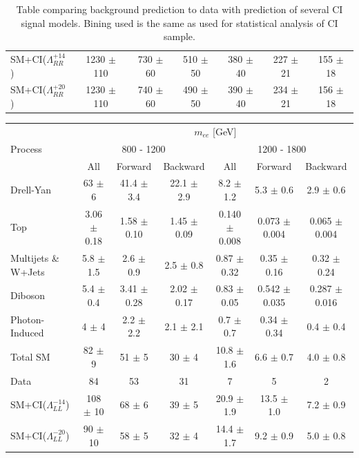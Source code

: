 \begin {table}[h]
\begin{center}
\begin{tabular}{  l | c c c | c c c  }
			SM+CI($\Lambda^{+14}_{RR}$) & 1230 $\pm$ 110 & 730 $\pm$ 60 & 510 $\pm$ 50 & 380 $\pm$ 40 & 227 $\pm$ 21 & 155 $\pm$ 18 \\
			SM+CI($\Lambda^{+20}_{RR}$) & 1230 $\pm$ 110 & 740 $\pm$ 60 & 490 $\pm$ 50 & 390 $\pm$ 40 & 234 $\pm$ 21 & 156 $\pm$ 18 \\
			\hline
		\end{tabular}
	  	\caption{Table comparing background prediction to data with prediction of several CI signal models. Bining used is the same as used for statistical analysis of CI sample.}
	  	\label{tab:CI_results1}
	  	\end{center}
	\end {table}

	\begin {table}[h]
		\footnotesize 
		\begin{center}
		\begin{tabular}{  l | c c c | c c c  }	
			\hline
			\hline
			\multirow{3}{*}{Process} 	& \multicolumn{6}{c}{$m_{ee}$ [GeV]} \\
										& \multicolumn{3}{c}{800 - 1200} & \multicolumn{3}{c}{1200 - 1800} \\
										\cline{2-7}
										& All & Forward & Backward & All & Forward & Backward \\
			\hline
			Drell-Yan & 63 $\pm$ 6 & 41.4 $\pm$ 3.4 & 22.1 $\pm$ 2.9 & 8.2 $\pm$ 1.2 & 5.3 $\pm$ 0.6 & 2.9 $\pm$ 0.6 \\
			Top & 3.06 $\pm$ 0.18 & 1.58 $\pm$ 0.10 & 1.45 $\pm$ 0.09 & 0.140 $\pm$ 0.008 & 0.073 $\pm$ 0.004 & 0.065 $\pm$ 0.004 \\
			Multijets \& W+Jets & 5.8 $\pm$ 1.5 & 2.6 $\pm$ 0.9 & 2.5 $\pm$ 0.8 & 0.87 $\pm$ 0.32 & 0.35 $\pm$ 0.16 & 0.32 $\pm$ 0.24 \\
			Diboson & 5.4 $\pm$ 0.4 & 3.41 $\pm$ 0.28 & 2.02 $\pm$ 0.17 & 0.83 $\pm$ 0.05 & 0.542 $\pm$ 0.035 & 0.287 $\pm$ 0.016 \\
			Photon-Induced & 4 $\pm$ 4 & 2.2 $\pm$ 2.2 & 2.1 $\pm$ 2.1 & 0.7 $\pm$ 0.7 & 0.34 $\pm$ 0.34 & 0.4 $\pm$ 0.4 \\
			\hline
			Total SM & 82 $\pm$ 9 & 51 $\pm$ 5 & 30 $\pm$ 4 & 10.8 $\pm$ 1.6 & 6.6 $\pm$ 0.7 & 4.0 $\pm$ 0.8 \\
			\hline
			Data & 84 & 53 & 31 & 7 & 5 & 2 \\
			\hline
			SM+CI($\Lambda^{-14}_{LL}$) & 108 $\pm$ 10 & 68 $\pm$ 6 & 39 $\pm$ 5 & 20.9 $\pm$ 1.9 & 13.5 $\pm$ 1.0 & 7.2 $\pm$ 0.9 \\
			SM+CI($\Lambda^{-20}_{LL}$) & 90 $\pm$ 10 & 58 $\pm$ 5 & 32 $\pm$ 4 & 14.4 $\pm$ 1.7 & 9.2 $\pm$ 0.9 & 5.0 $\pm$ 0.8 \\

\end{tabular}
\end{center}
\end{table}
